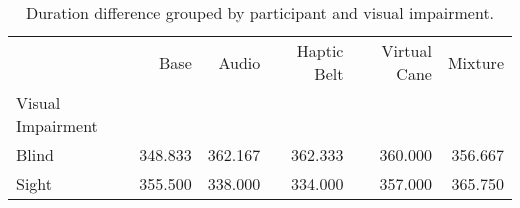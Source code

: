 
\begin{table}[!htb]
\centering
\caption{Duration difference grouped by participant and visual impairment.}
\label{tab:duracao_average_group}
\begin{tabular}{lrrrrr}
\toprule
{} &    Base &   Audio &  Haptic Belt &  Virtual Cane &  Mixture \\
Visual Impairment &         &         &              &               &          \\
\midrule
Blind             & 348.833 & 362.167 &      362.333 &       360.000 &  356.667 \\
Sight             & 355.500 & 338.000 &      334.000 &       357.000 &  365.750 \\
\bottomrule
\end{tabular}
\end{table}


